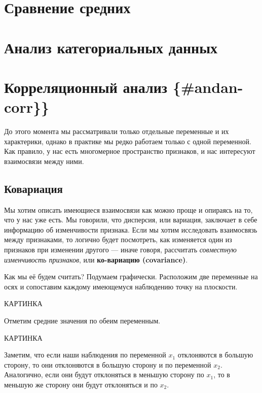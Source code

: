 \documentclass[
  letterpaper,
  DIV=11,
  numbers=noendperiod]{scrreprt}
\theoremstyle{definition}
\theoremstyle{remark}
\begin{document}

\chapter{Сравнение средних}\label{andan-ttest}


\chapter{Анализ категориальных данных}\label{andan-chisq}


\chapter{Корреляционный анализ
\{\#andan-corr\}\}}\label{ux43aux43eux440ux440ux435ux43bux44fux446ux438ux43eux43dux43dux44bux439-ux430ux43dux430ux43bux438ux437-andan-corr}

До этого момента мы рассматривали только отдельные переменные и их
характерики, однако в практике мы редко работаем только с одной
переменной. Как правило, у нас есть многомерное пространство признаков,
и нас интересуют взаимосвязи между ними.

\section{Ковариация}\label{andan-corr-cov}

Мы хотим описать имеющиеся взаимосвязи как можно проще и опираясь на то,
что у нас уже есть. Мы говорили, что дисперсия, или вариация, заключает
в себе информацию об изменчивости признака. Если мы хотим исследовать
взаимосвязь между признаками, то логично будет посмотреть, как
изменяется один из признаков при изменении другого --- иначе говоря,
рассчитать \emph{совместную изменчивость признаков}, или
\textbf{ко-вариацию (covariance)}.

Как мы её будем считать? Подумаем графически. Расположим две переменные
на осях и сопоставим каждому имеющемуся наблюдению точку на плоскости.

КАРТИНКА

Отметим средние значения по обеим переменным.

КАРТИНКА

Заметим, что если наши наблюдения по переменной \(x_1\) отклоняются в
большую сторону, то они отклоняются в большую сторону и по переменной
\(x_2\). Аналогично, если они будут отклоняться в меньшую сторону по
\(x_1\), то в меньшую же сторону они будут отклоняться и по \(x_2\).
\end{document}
